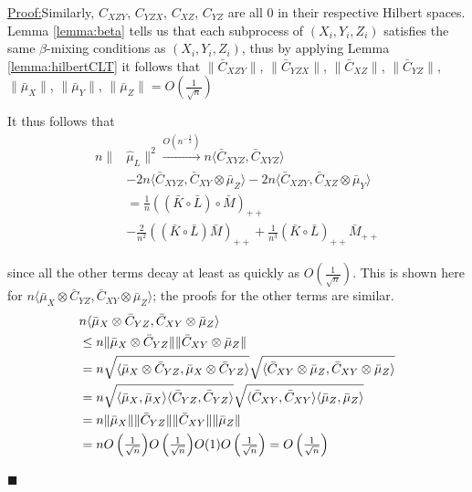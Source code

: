 \documentclass[]{article}
\newenvironment{claimproof}[1]{\par\noindent\underline{Proof:}\space#1}{\hfill $\blacksquare$}
\begin{document}
\begin{claimproof}
Similarly, $C_{XZY}$, $C_{YZX}$, $C_{XZ}$, $C_{YZ}$ are all 0 in their respective Hilbert spaces. Lemma \ref{lemma:beta} tells us that each subprocess of $(X_i,Y_i,Z_i)$ satisfies the same $\beta$-mixing conditions as $(X_i,Y_i,Z_i)$, thus by applying Lemma \ref{lemma:hilbertCLT} it follows that $\|\bar{C}_{XZY}\|$, $\|\bar{C}_{YZX}\|$, $\|\bar{C}_{XZ}\|$, $\|\bar{C}_{YZ}\|$, $\|\bar{\mu}_X\|$, $\|\bar{\mu}_Y\|$, $\|\bar{\mu}_Z\| = O\left(\frac{1}{\sqrt{n}}\right)$

It thus follows that
\begin{align*}
n\|&\hat \mu_L\|^2  \xrightarrow{O(n^{-\frac{1}{2}})} n\langle \bar{C}_{XYZ},\bar{C}_{XYZ} \rangle \\ &-
2n\langle \bar{C}_{XYZ},\bar{C}_{XY}\otimes\bar{\mu}_Z \rangle -
2n\langle \bar{C}_{XZY},\bar{C}_{XZ}\otimes\bar{\mu}_Y \rangle \\ &=
\frac{1}{n}((\bar{K}\circ \bar{L}) \circ \bar{M})_{++}\\& - \frac{2}{n^2}((\bar{K}\circ \bar{L})\bar{M})_{++} + \frac{1}{n^3}(\bar{K}\circ \bar{L})_{++}\bar{M}_{++}
\end{align*}

since all the other terms decay at least as quickly as $O(\frac{1}{\sqrt{n}})$. This is shown here for $n\langle \bar{\mu}_X\otimes\bar{C}_{YZ},\bar{C}_{XY}\otimes\bar{\mu}_Z \rangle$; the proofs for the other terms are similar.
\begin{align*}
&n\langle \bar{\mu}_X\otimes\bar{C}_{YZ},\bar{C}_{XY}\otimes\bar{\mu}_Z \rangle \\
&\leq n \| \bar{\mu}_X\otimes\bar{C}_{YZ}\| \|\bar{C}_{XY}\otimes\bar{\mu}_Z \| \\
& = n\sqrt{\langle \bar{\mu}_X\otimes\bar{C}_{YZ} , \bar{\mu}_X\otimes\bar{C}_{YZ} \rangle} \sqrt{\langle \bar{C}_{XY}\otimes\bar{\mu}_Z, \bar{C}_{XY}\otimes\bar{\mu}_Z \rangle} \\
& = n\sqrt{\langle \bar{\mu}_X, \bar{\mu}_X \rangle \langle \bar{C}_{YZ} , \bar{C}_{YZ} \rangle} \sqrt{\langle \bar{C}_{XY}, \bar{C}_{XY} \rangle \langle \bar{\mu}_Z, \bar{\mu}_Z \rangle} \\
& =  n \| \bar{\mu}_X\|\|\bar{C}_{YZ}\| \|\bar{C}_{XY}\|\|\bar{\mu}_Z \| \\
& = n \mathsmaller{O\left(\frac{1}{\sqrt{n}}\right)} \mathsmaller{O\left(\frac{1}{\sqrt{n}}\right)} O(1) \mathsmaller{O\left(\frac{1}{\sqrt{n}}\right)} = \mathsmaller{O\left(\frac{1}{\sqrt{n}}\right)}
\end{align*}


\end{claimproof}
\end{document}
